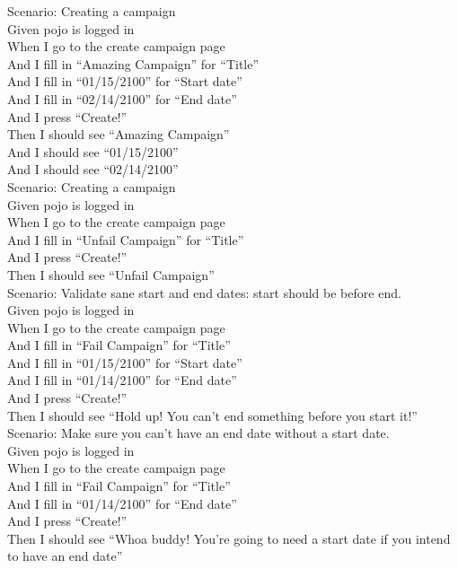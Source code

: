\documentclass[12pt]{article}
\begin{document}
Scenario: Creating a campaign \\
  Given pojo is logged in \\
  When I go to the create campaign page \\
  And I fill in ``Amazing Campaign'' for ``Title'' \\
  And I fill in ``01/15/2100'' for ``Start date'' \\
  And I fill in ``02/14/2100'' for ``End date''   \\
  And I press ``Create!'' \\
  Then I should see ``Amazing Campaign'' \\
  And I should see ``01/15/2100'' \\
  And I should see ``02/14/2100'' \\

Scenario: Creating a campaign \\
  Given pojo is logged in \\
  When I go to the create campaign page \\
  And I fill in ``Unfail Campaign'' for ``Title'' \\
  And I press ``Create!'' \\
  Then I should see ``Unfail Campaign'' \\

Scenario: Validate sane start and end dates: start should be before end. \\
  Given pojo is logged in \\
  When I go to the create campaign page \\
  And I fill in ``Fail Campaign'' for ``Title'' \\
  And I fill in ``01/15/2100'' for ``Start date'' \\
  And I fill in ``01/14/2100'' for ``End date'' \\
  And I press ``Create!'' \\
  Then I should see ``Hold up! You can't end something before you start it!'' \\

Scenario: Make sure you can't have an end date without a start date. \\
  Given pojo is logged in \\
  When I go to the create campaign page \\
  And I fill in ``Fail Campaign'' for ``Title'' \\
  And I fill in ``01/14/2100'' for ``End date'' \\
  And I press ``Create!'' \\
  Then I should see ``Whoa buddy! You're going to need a start date if you intend to have an end date'' \\
\end{document}

